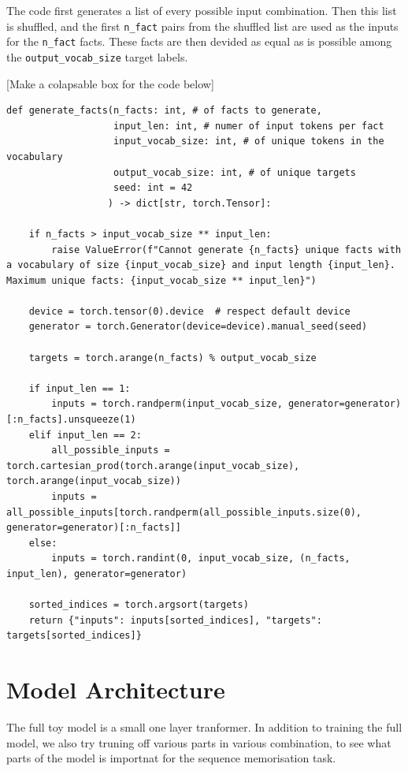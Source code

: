 \documentclass[11pt,a4paper]{article}
\begin{document}
The code first generates a list of every possible input combination. Then this list is shuffled, and the first \verb|n_fact| pairs from the shuffled list are used as the inputs for the \verb|n_fact| facts. These facts are then devided as equal as is possible among the \verb|output_vocab_size| target labels.

[Make a colapsable box for the code below]

\begin{verbatim}
def generate_facts(n_facts: int, # of facts to generate,
                   input_len: int, # numer of input tokens per fact   
                   input_vocab_size: int, # of unique tokens in the vocabulary
                   output_vocab_size: int, # of unique targets
                   seed: int = 42
                  ) -> dict[str, torch.Tensor]:
    
    if n_facts > input_vocab_size ** input_len:
        raise ValueError(f"Cannot generate {n_facts} unique facts with a vocabulary of size {input_vocab_size} and input length {input_len}. Maximum unique facts: {input_vocab_size ** input_len}")
    
    device = torch.tensor(0).device  # respect default device
    generator = torch.Generator(device=device).manual_seed(seed)

    targets = torch.arange(n_facts) % output_vocab_size

    if input_len == 1:
        inputs = torch.randperm(input_vocab_size, generator=generator)[:n_facts].unsqueeze(1)
    elif input_len == 2:
        all_possible_inputs = torch.cartesian_prod(torch.arange(input_vocab_size), torch.arange(input_vocab_size))
        inputs = all_possible_inputs[torch.randperm(all_possible_inputs.size(0), generator=generator)[:n_facts]]
    else:
        inputs = torch.randint(0, input_vocab_size, (n_facts, input_len), generator=generator)

    sorted_indices = torch.argsort(targets)    
    return {"inputs": inputs[sorted_indices], "targets": targets[sorted_indices]}

\end{verbatim}


\section{Model Architecture}
The full toy model is a small one layer tranformer. In addition to training the full model, we also try truning off various parts in various combination, to see what parts of the model is importnat for the sequence memorisation task. 
\end{document}
